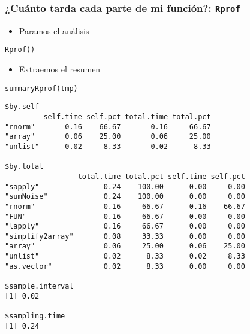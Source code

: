 \documentclass[xcolor={usenames,svgnames,dvipsnames}]{beamer}
\begin{document}
\begin{frame}[fragile]
\frametitle{¿Cuánto tarda cada parte de mi función?: \texttt{Rprof}}
\label{sec-3-7}

\begin{itemize}
\item Paramos el análisis
\end{itemize}

\lstset{language=R}
\begin{lstlisting}
Rprof()
\end{lstlisting}


\begin{itemize}
\item Extraemos el resumen
\end{itemize}

\lstset{language=R}
\begin{lstlisting}
summaryRprof(tmp)
\end{lstlisting}


\begin{verbatim}
$by.self
         self.time self.pct total.time total.pct
"rnorm"       0.16    66.67       0.16     66.67
"array"       0.06    25.00       0.06     25.00
"unlist"      0.02     8.33       0.02      8.33

$by.total
                 total.time total.pct self.time self.pct
"sapply"               0.24    100.00      0.00     0.00
"sumNoise"             0.24    100.00      0.00     0.00
"rnorm"                0.16     66.67      0.16    66.67
"FUN"                  0.16     66.67      0.00     0.00
"lapply"               0.16     66.67      0.00     0.00
"simplify2array"       0.08     33.33      0.00     0.00
"array"                0.06     25.00      0.06    25.00
"unlist"               0.02      8.33      0.02     8.33
"as.vector"            0.02      8.33      0.00     0.00

$sample.interval
[1] 0.02

$sampling.time
[1] 0.24
\end{verbatim}
\end{frame}
\end{document}
